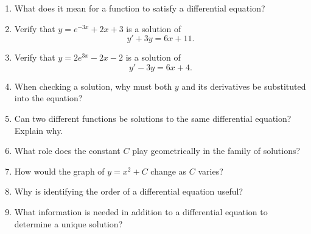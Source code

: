 \begin{enumerate}
  \item What does it mean for a function to satisfy a differential equation?
  \item Verify that $y = e^{-3x} + 2x + 3$ is a solution of
    \[
      y' + 3y = 6x + 11.
    \]
  \item Verify that $y = 2e^{3x} - 2x - 2$ is a solution of
    \[
      y' - 3y = 6x + 4.
    \]
  \item When checking a solution, why must both $y$ and its derivatives be substituted into the equation?
  \item Can two different functions be solutions to the same differential equation? Explain why.
  \item What role does the constant $C$ play geometrically in the family of solutions?
  \item How would the graph of $y = x^2 + C$ change as $C$ varies?
  \item Why is identifying the order of a differential equation useful?
  \item What information is needed in addition to a differential equation to determine a unique solution?
\end{enumerate}
